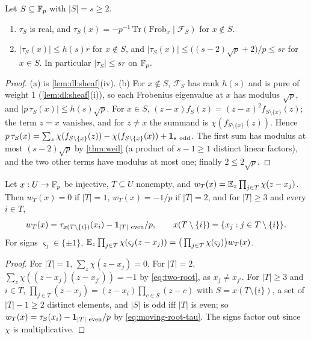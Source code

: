 \begin{lemma}\label{lem:moving-root-trace}
Let $S\subseteq\mathbb F_p$ with $|S|=s\ge2$.
\begin{enumerate}[label=\textup{(\alph*)}]
\item $\tau_S$ is real, and $\tau_S(x)=-p^{-1}\,\mathrm{Tr}(\mathrm{Frob}_x\mid\mathcal F_S)$
  for $x\notin S$.
\item $|\tau_S(x)|\le h(s)r$ for $x\notin S$, and
  $|\tau_S(x)|\le\big((s-2)\sqrt p+2\big)/p\le sr$ for $x\in S$. In particular
  $|\tau_S|\le sr$ on $\mathbb F_p$.
\end{enumerate}
\end{lemma}

\begin{proof}
(a) is \cref{lem:dl:sheaf}(iv). (b) For $x\notin S$, $\mathcal F_S$ has rank
$h(s)$ and is pure of weight $1$ (\cref{lem:dl:sheaf}(i)), so each Frobenius
eigenvalue at $x$ has modulus $\sqrt p$, and $|p\,\tau_S(x)|\le h(s)\sqrt p$.
For $x\in S$, $(z-x)f_S(z)=(z-x)^2f_{S\setminus\{x\}}(z)$; the term $z=x$
vanishes, and for $z\ne x$ the summand is $\chi(f_{S\setminus\{x\}}(z))$. Hence
$p\,\tau_S(x)=\sum_z\chi(f_{S\setminus\{x\}}(z))-\chi(f_{S\setminus\{x\}}(x))
+\mathbf 1_{s\ \rm odd}$. The first sum has modulus at most $(s-2)\sqrt p$ by
\cref{thm:weil} (a product of $s-1\ge1$ distinct linear factors), and the two
other terms have modulus at most one; finally $2\le2\sqrt p$.
\end{proof}

\begin{lemma}\label{lem:star-trace}
Let $x:U\to\mathbb F_p$ be injective, $T\subseteq U$ nonempty, and
$w_T(x)=\mathbb E_z\prod_{j\in T}\chi(z-x_j)$. Then $w_T(x)=0$ if $|T|=1$,
$w_T(x)=-1/p$ if $|T|=2$, and for $|T|\ge3$ and every $i\in T$,
\[
  w_T(x)=\tau_{x(T\setminus\{i\})}(x_i)-\frac{\one_{|T|\ \rm even}}p,\qquad
  x(T\setminus\{i\})=\{x_j:j\in T\setminus\{i\}\}.
\]
For signs $\varsigma_j\in\{\pm1\}$,
$\mathbb E_z\prod_{j\in T}\chi(\varsigma_j(z-x_j))=\big(\prod_{j\in T}\chi(\varsigma_j)\big)w_T(x)$.
\end{lemma}

\begin{proof}
For $|T|=1$, $\sum_z\chi(z-x_j)=0$. For $|T|=2$, $\sum_z\chi((z-x_j)(z-x_{j'}))=-1$
by \eqref{eq:two-root}, as $x_j\ne x_{j'}$. For $|T|\ge3$ and $i\in T$,
$\prod_{j\in T}(z-x_j)=(z-x_i)\prod_{c\in S}(z-c)$ with
$S=x(T\setminus\{i\})$, a set of $|T|-1\ge2$ distinct elements, and
$|S|$ is odd iff $|T|$ is even; so $w_T(x)=\tau_S(x_i)-\mathbf 1_{|T|\ \rm even}/p$
by \eqref{eq:moving-root-tau}. The signs factor out since $\chi$ is
multiplicative.
\end{proof}

